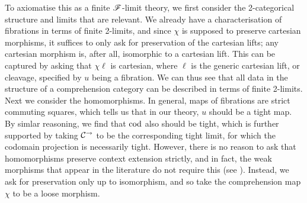 \documentclass[../thesis.tex]{subfiles}
\begin{document}
To axiomatise this as a finite ${\mathscr{F}}$-limit theory, we first consider the 2-categorical structure and limits that
are relevant. We already have a characterisation of fibrations in terms of finite 2-limits, and since $\chi$ is
supposed to preserve cartesian morphisms, it suffices to only ask for preservation of the cartesian lifts; any
cartesian morphism is, after all, isomorphic to a cartesian lift. This can be captured by asking that $\chi\ell$
is cartesian, where $\ell$ is the generic cartesian lift, or cleavage, specified by $u$ being a fibration. We can
thus see that all data in the structure of a comprehension category can be described in terms of finite 2-limits.
Next we consider the homomorphisms. In general, maps of fibrations are strict commuting squares, which tells us
that in our theory, $u$ should be a tight map. By simlar reasoning, we find that ${\mathrm{cod}}$ also should be tight, which
is further supported by taking ${\mathcal{C}}^\to$ to be the corresponding tight limit, for which the codomain projection is
necessarily tight. However, there is no reason to ask that homomorphisms preserve context extension strictly, and
in fact, the weak morphisms that appear in the literature do not require this (see \cite{ahrens2024}). Instead, we
ask for preservation only up to isomorphism, and so take the comprehension map $\chi$ to be a loose morphism.
\end{document}
